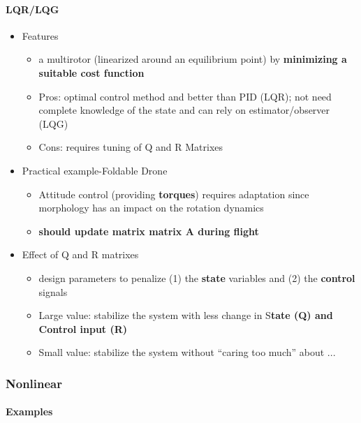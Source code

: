 \documentclass[]{article}
\let\oldparagraph\paragraph
\renewcommand{\paragraph}[1]{\oldparagraph{#1}\mbox{}}
\begin{document}
\paragraph{LQR/LQG}\label{header-n732}

\begin{itemize}
\item
  Features

  \begin{itemize}
  \item
    a multirotor (linearized around an equilibrium point) by
    \textbf{minimizing a suitable cost function}
  \item
    Pros: optimal control method and better than PID (LQR); not need
    complete knowledge of the state and can rely on estimator/observer
    (LQG)
  \item
    Cons: requires tuning of Q and R Matrixes
  \end{itemize}
\item
  Practical example-Foldable Drone

  \begin{itemize}
  \item
    Attitude control (providing \textbf{torques}) requires adaptation
    since morphology has an impact on the rotation dynamics
  \item
    \textbf{should update matrix matrix A during flight}
  \end{itemize}
\item
  Effect of Q and R matrixes

  \begin{itemize}
  \item
    design parameters to penalize (1) the \textbf{state} variables and
    (2) the \textbf{control} signals
  \item
    Large value: stabilize the system with less change in S\textbf{tate
    (Q) and Control input (R)}
  \item
    Small value: stabilize the system without ``caring too much'' about
    ...
  \end{itemize}
\end{itemize}

\subsubsection{Nonlinear}\label{header-n759}

\paragraph{Examples}\label{header-n760}
\end{document}
